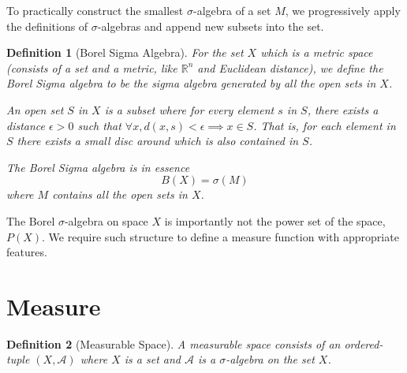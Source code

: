 \documentclass{article}
\newtheorem{defi}{Definition}[section]
\begin{document}
To practically construct the smallest $\sigma$-algebra of a set $M$, we progressively apply the definitions of $\sigma$-algebras and append new subsets into the set.

\begin{defi}[Borel Sigma Algebra]
    For the set $X$ which is a metric space (consists of a set and a metric, like $\mathbb{R}^n$ and Euclidean distance), we define the Borel Sigma algebra to be the sigma algebra generated by all the open sets in $X$.

    An open set $S$ in $X$ is a subset where for every element $s$ in $S$, there exists a distance $\epsilon > 0$ such that $\forall x, d(x, s) < \epsilon \implies x \in S$. That is, for each element in $S$ there exists a small disc around which is also contained in $S$.

    The Borel Sigma algebra is in essence
    \[
        B(X) = \sigma(M)
    \]
    where $M$ contains all the open sets in $X$.
\end{defi}

The Borel $\sigma$-algebra on space $X$ is importantly not the power set of the space, $P(X)$. We require such structure to define a measure function with appropriate features.

\newpage
\section{Measure}

\begin{defi}[Measurable Space]
    A measurable space consists of an ordered-tuple $(X, \mathcal A)$ where $X$ is a set and $\mathcal A$ is a $\sigma$-algebra on the set $X$.
\end{defi}
\end{document}
